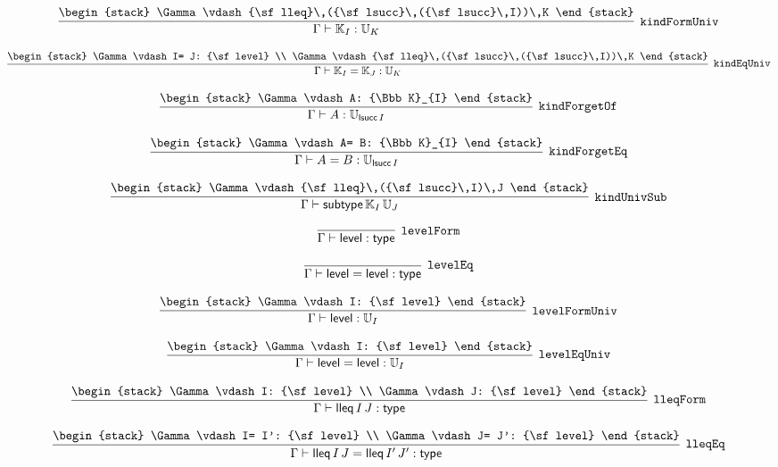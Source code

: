 \[
\infer[{\tt kindFormUniv}]{\Gamma \vdash {\Bbb K}_{I}: {\Bbb U}_{K}}{
\begin{stack}
\Gamma \vdash {\sf lleq}\,({\sf lsucc}\,({\sf lsucc}\,I))\,K
\end{stack}}
\]

\[
\infer[{\tt kindEqUniv}]{\Gamma \vdash {\Bbb K}_{I}= {\Bbb K}_{J}: {\Bbb U}_{K}}{
\begin{stack}
\Gamma \vdash I= J: {\sf level}
\\
\Gamma \vdash {\sf lleq}\,({\sf lsucc}\,({\sf lsucc}\,I))\,K
\end{stack}}
\]

\[
\infer[{\tt kindForgetOf}]{\Gamma \vdash A: {\Bbb U}_{{\sf lsucc}\,I}}{
\begin{stack}
\Gamma \vdash A: {\Bbb K}_{I}
\end{stack}}
\]

\[
\infer[{\tt kindForgetEq}]{\Gamma \vdash A= B: {\Bbb U}_{{\sf lsucc}\,I}}{
\begin{stack}
\Gamma \vdash A= B: {\Bbb K}_{I}
\end{stack}}
\]

\[
\infer[{\tt kindUnivSub}]{\Gamma \vdash {\sf subtype}\,{\Bbb K}_{I}\,{\Bbb U}_{J}}{
\begin{stack}
\Gamma \vdash {\sf lleq}\,({\sf lsucc}\,I)\,J
\end{stack}}
\]

\[
\infer[{\tt levelForm}]{\Gamma \vdash {\sf level}: {\sf type}}{}
\]

\[
\infer[{\tt levelEq}]{\Gamma \vdash {\sf level}= {\sf level}: {\sf type}}{}
\]

\[
\infer[{\tt levelFormUniv}]{\Gamma \vdash {\sf level}: {\Bbb U}_{I}}{
\begin{stack}
\Gamma \vdash I: {\sf level}
\end{stack}}
\]

\[
\infer[{\tt levelEqUniv}]{\Gamma \vdash {\sf level}= {\sf level}: {\Bbb U}_{I}}{
\begin{stack}
\Gamma \vdash I: {\sf level}
\end{stack}}
\]

\[
\infer[{\tt lleqForm}]{\Gamma \vdash {\sf lleq}\,I\,J: {\sf type}}{
\begin{stack}
\Gamma \vdash I: {\sf level}
\\
\Gamma \vdash J: {\sf level}
\end{stack}}
\]

\[
\infer[{\tt lleqEq}]{\Gamma \vdash {\sf lleq}\,I\,J= {\sf lleq}\,I'\,J': {\sf type}}{
\begin{stack}
\Gamma \vdash I= I': {\sf level}
\\
\Gamma \vdash J= J': {\sf level}
\end{stack}}
\]

